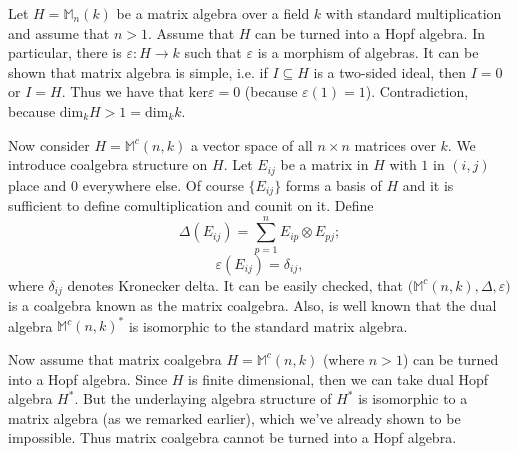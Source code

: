 \documentclass[12pt]{article}
\begin{document}
Let $H=\mathbb{M}_{n}(k)$ be a matrix algebra over a field $k$ with standard multiplication and assume that $n>1$. Assume that $H$ can be turned into a Hopf algebra. In particular, there is $\varepsilon:H\to k$ such that $\varepsilon$ is a morphism of algebras. It can be shown that matrix algebra is simple, i.e. if $I\subseteq H$ is a two-sided ideal, then $I=0$ or $I=H$. Thus we have that $\mathrm{ker}\varepsilon=0$ (because $\varepsilon(1)=1$). Contradiction, because $\mathrm{dim}_{k}H>1=\mathrm{dim}_{k}k$.

Now consider $H=\mathbb{M}^{c}(n,k)$ a vector space of all $n\times n$ matrices over $k$. We introduce coalgebra structure on $H$. Let $E_{ij}$ be a matrix in $H$ with $1$ in $(i,j)$ place and $0$ everywhere else. Of course $\{E_{ij}\}$ forms a basis of $H$ and it is sufficient to define comultiplication and counit on it. Define
$$\Delta(E_{ij})=\sum_{p=1}^{n} E_{ip}\otimes E_{pj};$$
$$\varepsilon(E_{ij})=\delta_{ij},$$
where $\delta_{ij}$ denotes Kronecker delta. It can be easily checked, that $\big(\mathbb{M}^c(n,k),\Delta,\varepsilon\big)$ is a coalgebra known as the matrix coalgebra. Also, is well known that the dual algebra $\mathbb{M}^c(n,k)^*$ is isomorphic to the standard matrix algebra.

Now assume that matrix coalgebra $H=\mathbb{M}^c(n,k)$ (where $n>1$) can be turned into a Hopf algebra. Since $H$ is finite dimensional, then we can take dual Hopf algebra $H^*$. But the underlaying algebra structure of $H^*$ is isomorphic to a matrix algebra (as we remarked earlier), which we've already shown to be impossible. Thus matrix coalgebra cannot be turned into a Hopf algebra.
\end{document}
